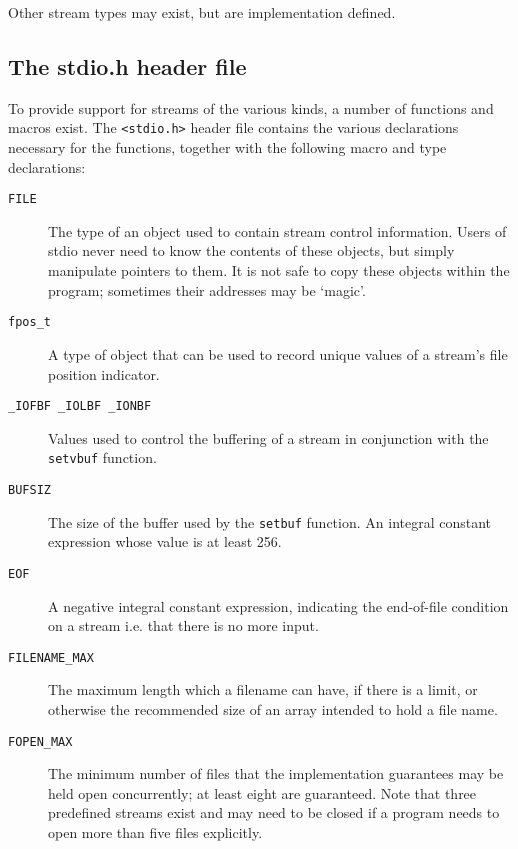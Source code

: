     Other stream types may exist, but are implementation defined.


   

  

  \subsection{The stdio.h header file}
   

   To provide support for streams of the various kinds, a number of
    functions and macros exist.  The \texttt{<stdio.h>} header file
    contains the various declarations necessary for the functions, together
    with the following macro and type declarations:


   \begin{description}
    \item[\texttt{FILE}] The type of an object used to contain stream control
     information.  Users of stdio never need to know the
     contents of these objects, but simply manipulate pointers
     to them.  It is not safe to copy these objects within the
     program; sometimes their addresses may be `magic'.

    \item[\texttt{fpos\_t}] A type of object that can be used to record unique values
     of a stream's file position indicator.

    \item[\texttt{\_IOFBF \_IOLBF \_IONBF}] Values used to control the buffering of a stream in
     conjunction with the \texttt{setvbuf} function.

    \item[\texttt{BUFSIZ}] The size of the buffer used by the \texttt{setbuf} function.  An
     integral constant expression whose value is at least 256.

    \item[\texttt{EOF}] A negative integral constant expression, indicating the
     end-of-file condition on a stream i.e. that there is no
     more input.

    \item[\texttt{FILENAME\_MAX}] The maximum length which a filename can have, if there is
     a limit, or otherwise the recommended size of an array
     intended to hold a file name.

    \item[\texttt{FOPEN\_MAX}] The minimum number of files that the implementation
     guarantees may be held open concurrently; at least eight
     are guaranteed.  Note that three predefined streams exist
     and may need to be closed if a program needs to open more
     than five files explicitly.


\end{description}
